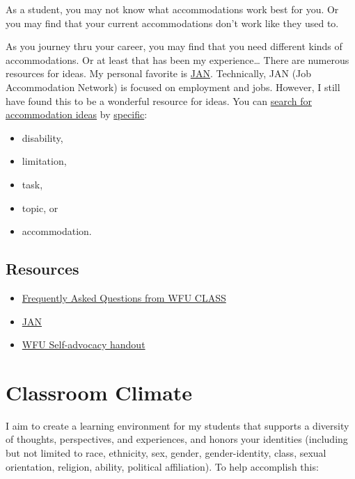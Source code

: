 As a student, you may not know what accommodations work best for you. Or you may find that your current accommodations don't work like they used to.

As you journey thru your career, you may find that you need different kinds of accommodations. Or at least that has been my experience\ldots{} There are numerous resources for ideas.
My personal favorite is \href{https://askjan.org/}{JAN}. Technically, JAN (Job Accommodation Network) is focused on employment and jobs.
However, I still have found this to be a wonderful resource for ideas.
You can \href{https://askjan.org/soar.cfm}{search for accommodation ideas} by \href{https://askjan.org/a-to-z.cfm}{specific}:

\begin{itemize}
\tightlist
\item
  disability,
\item
  limitation,
\item
  task,
\item
  topic, or
\item
  accommodation.
\end{itemize}

\hypertarget{resources}{%
\section{Resources}\label{resources}}

\begin{itemize}
\tightlist
\item
  \href{https://class.wfu.edu/frequently-asked-questions-about-lac-ds/}{Frequently Asked Questions from WFU CLASS}
\item
  \href{https://askjan.org/}{JAN}
\item
  \href{https://docs.google.com/document/d/1X44zJyTz8-s9t6IXw0bII2DCFiOk1NR2MRfTi8wBiIc/}{WFU Self-advocacy handout}
\end{itemize}

\hypertarget{classroom-climate}{%
\chapter{Classroom Climate}\label{classroom-climate}}

I aim to create a learning environment for my students that supports a diversity of thoughts, perspectives, and experiences, and honors your identities (including but not limited to race, ethnicity, sex, gender, gender-identity, class, sexual orientation, religion, ability, political affiliation). To help accomplish this:

